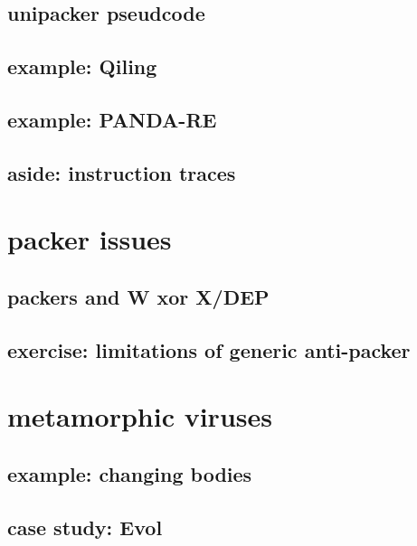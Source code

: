 \subsection{unipacker pseudcode}


\subsection{example: Qiling}

\subsection{example: PANDA-RE}


\subsection{aside: instruction traces}


\section{packer issues}
\subsection{packers and W xor X/DEP}


\subsection{exercise: limitations of generic anti-packer}


\section{metamorphic viruses}


\subsection{example: changing bodies}


\subsection{case study: Evol}


